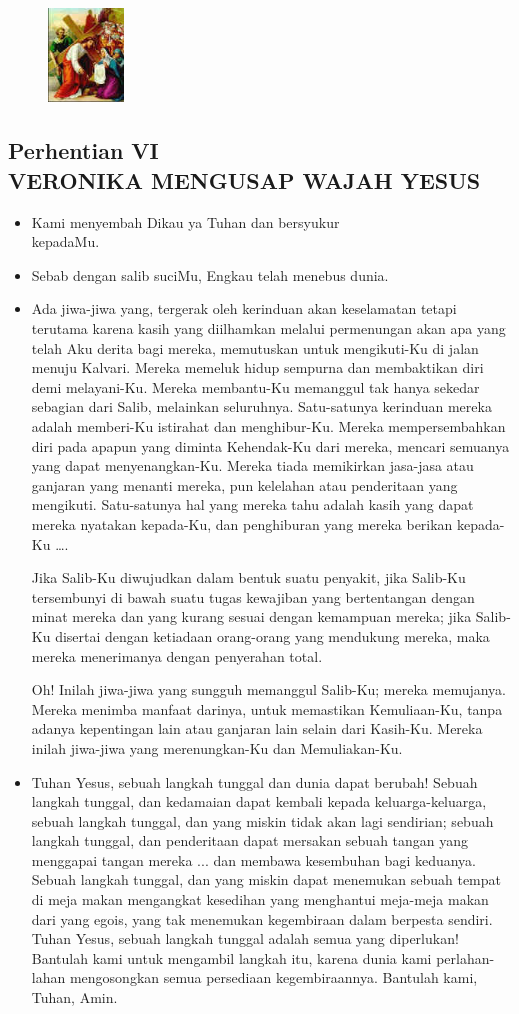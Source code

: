\documentclass[a5paper,headsepline,titlepage,10pt,nnormalheadings,DIVcalc]{scrbook}
\newcommand{\BU}[1]{\begin{itemize} \item[U:] #1 \end{itemize}}
\newcommand{\BP}[1]{\begin{itemize} \item[P:] #1 \end{itemize}}
\newcommand{\kamiMenyembah}{\BP{ Kami menyembah Dikau ya Tuhan dan bersyukur\\kepadaMu.}
\BU{ Sebab dengan salib suciMu, Engkau telah menebus dunia.}
}
\begin{document}
\begin{figure}
\includegraphics[width=2cm]{jalansalib_files/06_small.jpg}
\end{figure}
\subsection*{Perhentian VI\\
VERONIKA MENGUSAP WAJAH YESUS}

\kamiMenyembah

\BP{Ada jiwa-jiwa yang, tergerak oleh kerinduan akan keselamatan tetapi terutama karena kasih yang diilhamkan melalui permenungan akan apa yang telah Aku derita bagi mereka, memutuskan untuk mengikuti-Ku di jalan menuju Kalvari. Mereka memeluk hidup sempurna dan membaktikan diri demi melayani-Ku. Mereka membantu-Ku memanggul tak hanya sekedar sebagian dari Salib, melainkan seluruhnya. Satu-satunya kerinduan mereka adalah memberi-Ku istirahat dan menghibur-Ku. Mereka mempersembahkan diri pada apapun yang diminta Kehendak-Ku dari mereka, mencari semuanya yang dapat menyenangkan-Ku. Mereka tiada memikirkan jasa-jasa atau ganjaran yang menanti mereka, pun kelelahan atau penderitaan yang mengikuti. Satu-satunya hal yang mereka tahu adalah kasih yang dapat mereka nyatakan kepada-Ku, dan penghiburan yang mereka berikan kepada-Ku \dots .

Jika Salib-Ku diwujudkan dalam bentuk suatu penyakit, jika Salib-Ku tersembunyi di bawah suatu tugas kewajiban yang bertentangan dengan minat mereka dan yang kurang sesuai dengan kemampuan mereka; jika Salib-Ku disertai dengan ketiadaan orang-orang yang mendukung mereka, maka mereka menerimanya dengan penyerahan total.

Oh! Inilah jiwa-jiwa yang sungguh memanggul Salib-Ku; mereka memujanya. Mereka menimba manfaat darinya, untuk memastikan Kemuliaan-Ku, tanpa adanya kepentingan lain atau ganjaran lain selain dari Kasih-Ku. Mereka inilah jiwa-jiwa yang merenungkan-Ku dan Memuliakan-Ku.}

\BU{Tuhan Yesus, sebuah langkah tunggal dan dunia dapat berubah! Sebuah langkah tunggal, dan kedamaian dapat kembali kepada keluarga-keluarga, sebuah langkah tunggal, dan yang miskin tidak akan lagi sendirian; sebuah langkah tunggal, dan penderitaan dapat mersakan sebuah tangan yang menggapai tangan mereka ... dan membawa kesembuhan bagi keduanya. Sebuah langkah tunggal, dan yang miskin dapat menemukan sebuah tempat di meja makan mengangkat kesedihan yang menghantui meja-meja makan dari yang egois, yang tak menemukan kegembiraan dalam berpesta sendiri. Tuhan Yesus, sebuah langkah tunggal adalah semua yang diperlukan! Bantulah kami untuk mengambil langkah itu, karena dunia kami perlahan-lahan mengosongkan semua persediaan kegembiraannya. Bantulah kami, Tuhan, Amin.}
\end{document}
